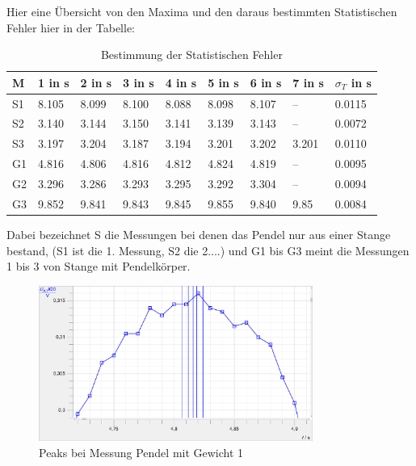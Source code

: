 \documentclass[twoside]{protokoll}
\begin{document}
Hier eine Übersicht von den Maxima und den daraus bestimmten Statistischen Fehler hier in der Tabelle:

\begin{table}[H]
    \centering
    \begin{tabularx}{1.0\textwidth}{X X X X X X X X X}
       \textbf{M} & \textbf{1 in s}  & \textbf{2 in s} & \textbf{3 in s} & \textbf{4 in s} & \textbf{5 in s} & \textbf{6 in s} & \textbf{7 in s} & \textbf{$\sigma_T$ in s} \\
       \toprule
        S1 & 8.105 & 8.099 & 8.100 & 8.088 & 8.098 & 8.107 &    -- & 0.0115 \\
        S2 & 3.140 & 3.144 & 3.150 & 3.141 & 3.139 & 3.143 &    -- & 0.0072 \\
        S3 & 3.197 & 3.204 & 3.187 & 3.194 & 3.201 & 3.202 & 3.201 & 0.0110 \\
        G1 & 4.816 & 4.806 & 4.816 & 4.812 & 4.824 & 4.819  &    -- & 0.0095 \\
        G2 & 3.296 & 3.286 & 3.293 & 3.295 & 3.292 & 3.304 &    -- & 0.0094 \\
        G3 & 9.852 & 9.841 & 9.843 & 9.845 & 9.855 & 9.840 & 9.85 &0.0084 \\
       \midrule
       \toprule
    \end{tabularx}
    \caption{Bestimmung der Statistischen Fehler}
\end{table}
Dabei bezeichnet S die Messungen bei denen das Pendel nur aus einer Stange bestand, (S1 ist die 1. Messung, S2 die 2....) und G1 bis G3 meint die Messungen 1 bis 3 von Stange mit Pendelkörper.

 
 
\begin{figure}[H]
    \centering
    \includegraphics[width=0.8\textwidth]{plots/unsicherheit-bestimmen-gewicht-1.pdf}
    \caption{Peaks bei Messung Pendel mit Gewicht 1}
\end{figure}
\end{document}
